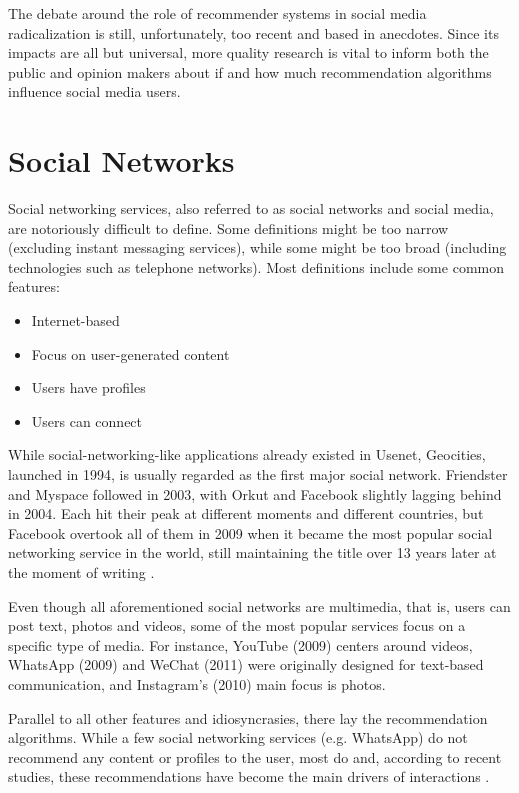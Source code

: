 The debate around the role of recommender systems in social media radicalization
is still, unfortunately, too recent and based in anecdotes. Since its impacts
are all but universal, more quality research is vital to inform both the public
and opinion makers about if and how much recommendation algorithms influence
social media users.

\section{Social Networks}
\label{sec:social_networks}

Social networking services, also referred to as social networks and social
media, are notoriously difficult to define. Some definitions might be too narrow
(excluding instant messaging services), while some might be too broad (including
technologies such as telephone networks). Most definitions
\citep{boyd_social_2007} include some common features:

\begin{itemize}
  \item Internet-based
  \item Focus on user-generated content
  \item Users have profiles
  \item Users can connect
\end{itemize}

While social-networking-like applications already existed in Usenet, Geocities,
launched in 1994, is usually regarded as the first major social network.
Friendster and Myspace followed in 2003, with Orkut and Facebook slightly
lagging behind in 2004. Each hit their peak at different moments and different
countries, but Facebook overtook all of them in 2009 when it became the most
popular social networking service in the world, still maintaining the title over
13 years later at the moment of writing \citep{noauthor_biggest_nodate}.

Even though all aforementioned social networks are multimedia, that is, users
can post text, photos and videos, some of the most popular services focus on a
specific type of media. For instance, YouTube (2009) centers around videos,
WhatsApp (2009) and WeChat (2011) were originally designed for text-based
communication, and Instagram's (2010) main focus is photos.

Parallel to all other features and idiosyncrasies, there lay the recommendation
algorithms. While a few social networking services (e.g. WhatsApp) do not
recommend any content or profiles to the user, most do and, according to recent
studies, these recommendations have become the main drivers of interactions
\citep{stoica_algorithmic_2018}.

